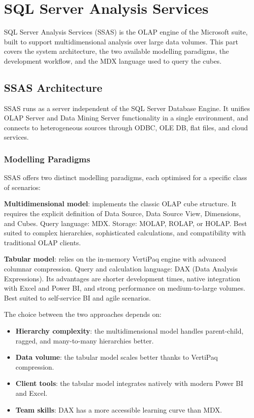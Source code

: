 
\section{SQL Server Analysis Services}
\label{part:ssas}

SQL Server Analysis Services (SSAS) is the OLAP engine of the Microsoft suite, built to support multidimensional analysis over large data volumes. This part covers the system architecture, the two available modelling paradigms, the development workflow, and the MDX language used to query the cubes.

\subsection{SSAS Architecture}
\label{sec:ssas-architecture}

SSAS runs as a server independent of the SQL Server Database Engine. It unifies OLAP Server and Data Mining Server functionality in a single environment, and connects to heterogeneous sources through ODBC, OLE DB, flat files, and cloud services.

\subsubsection{Modelling Paradigms}
\label{subsec:ssas-paradigms}

SSAS offers two distinct modelling paradigms, each optimised for a specific class of scenarios:

\begin{notebox}
\textbf{Multidimensional model}: implements the classic OLAP cube structure. It requires the explicit definition of Data Source, Data Source View, Dimensions, and Cubes. Query language: MDX. Storage: MOLAP, ROLAP, or HOLAP. Best suited to complex hierarchies, sophisticated calculations, and compatibility with traditional OLAP clients.

\textbf{Tabular model}: relies on the in-memory VertiPaq engine with advanced columnar compression. Query and calculation language: DAX (Data Analysis Expressions). Its advantages are shorter development times, native integration with Excel and Power BI, and strong performance on medium-to-large volumes. Best suited to self-service BI and agile scenarios.
\end{notebox}

The choice between the two approaches depends on:
\begin{itemize}
    \item \textbf{Hierarchy complexity}: the multidimensional model handles parent-child, ragged, and many-to-many hierarchies better.
    \item \textbf{Data volume}: the tabular model scales better thanks to VertiPaq compression.
    \item \textbf{Client tools}: the tabular model integrates natively with modern Power BI and Excel.
    \item \textbf{Team skills}: DAX has a more accessible learning curve than MDX.
\end{itemize}

